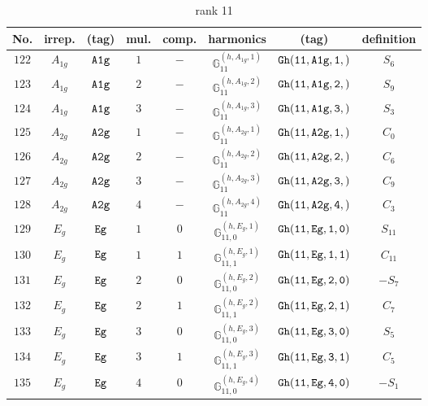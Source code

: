\documentclass[fleqn,8pt]{jsarticle}
\begin{document}
\begin{table}[ht!]
\begin{center}
\caption{rank 11}
\renewcommand{\arraystretch}{1.3}
\begin{tabular}{cccccccc} \hline \hline
No. & irrep. & (tag) & mul. & comp. & harmonics & (tag) & definition \\ \hline
$ 122 $ & $ A_{1g} $ & $ {\tt A1g} $ & $ 1 $ & $ - $ & $ \mathbb{G}_{11}^{(h,A_{1g},1)} $ & $ {\tt Gh(11,A1g,1,)} $ & $ S_{6} $ \\
$ 123 $ & $ A_{1g} $ & $ {\tt A1g} $ & $ 2 $ & $ - $ & $ \mathbb{G}_{11}^{(h,A_{1g},2)} $ & $ {\tt Gh(11,A1g,2,)} $ & $ S_{9} $ \\
$ 124 $ & $ A_{1g} $ & $ {\tt A1g} $ & $ 3 $ & $ - $ & $ \mathbb{G}_{11}^{(h,A_{1g},3)} $ & $ {\tt Gh(11,A1g,3,)} $ & $ S_{3} $ \\
$ 125 $ & $ A_{2g} $ & $ {\tt A2g} $ & $ 1 $ & $ - $ & $ \mathbb{G}_{11}^{(h,A_{2g},1)} $ & $ {\tt Gh(11,A2g,1,)} $ & $ C_{0} $ \\
$ 126 $ & $ A_{2g} $ & $ {\tt A2g} $ & $ 2 $ & $ - $ & $ \mathbb{G}_{11}^{(h,A_{2g},2)} $ & $ {\tt Gh(11,A2g,2,)} $ & $ C_{6} $ \\
$ 127 $ & $ A_{2g} $ & $ {\tt A2g} $ & $ 3 $ & $ - $ & $ \mathbb{G}_{11}^{(h,A_{2g},3)} $ & $ {\tt Gh(11,A2g,3,)} $ & $ C_{9} $ \\
$ 128 $ & $ A_{2g} $ & $ {\tt A2g} $ & $ 4 $ & $ - $ & $ \mathbb{G}_{11}^{(h,A_{2g},4)} $ & $ {\tt Gh(11,A2g,4,)} $ & $ C_{3} $ \\
$ 129 $ & $ E_{g} $ & $ {\tt Eg} $ & $ 1 $ & $ 0 $ & $ \mathbb{G}_{11,0}^{(h,E_{g},1)} $ & $ {\tt Gh(11,Eg,1,0)} $ & $ S_{11} $ \\
$ 130 $ & $ E_{g} $ & $ {\tt Eg} $ & $ 1 $ & $ 1 $ & $ \mathbb{G}_{11,1}^{(h,E_{g},1)} $ & $ {\tt Gh(11,Eg,1,1)} $ & $ C_{11} $ \\
$ 131 $ & $ E_{g} $ & $ {\tt Eg} $ & $ 2 $ & $ 0 $ & $ \mathbb{G}_{11,0}^{(h,E_{g},2)} $ & $ {\tt Gh(11,Eg,2,0)} $ & $ - S_{7} $ \\
$ 132 $ & $ E_{g} $ & $ {\tt Eg} $ & $ 2 $ & $ 1 $ & $ \mathbb{G}_{11,1}^{(h,E_{g},2)} $ & $ {\tt Gh(11,Eg,2,1)} $ & $ C_{7} $ \\
$ 133 $ & $ E_{g} $ & $ {\tt Eg} $ & $ 3 $ & $ 0 $ & $ \mathbb{G}_{11,0}^{(h,E_{g},3)} $ & $ {\tt Gh(11,Eg,3,0)} $ & $ S_{5} $ \\
$ 134 $ & $ E_{g} $ & $ {\tt Eg} $ & $ 3 $ & $ 1 $ & $ \mathbb{G}_{11,1}^{(h,E_{g},3)} $ & $ {\tt Gh(11,Eg,3,1)} $ & $ C_{5} $ \\
$ 135 $ & $ E_{g} $ & $ {\tt Eg} $ & $ 4 $ & $ 0 $ & $ \mathbb{G}_{11,0}^{(h,E_{g},4)} $ & $ {\tt Gh(11,Eg,4,0)} $ & $ - S_{1} $ \\

\end{tabular}
\end{center}
\end{table}
\end{document}
